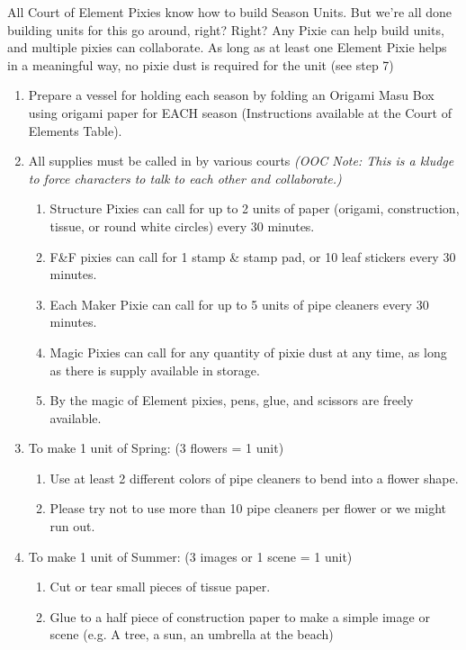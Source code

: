 \documentclass[green]{PP}
\begin{document}
\name{\gSesons{}}

All Court of Element Pixies know how to build Season Units. But we’re all done building units for this go around, right? Right? Any Pixie can help build units, and multiple pixies can collaborate. As long as at least one Element Pixie helps in a meaningful way, no pixie dust is required for the unit (see step 7)

\begin{enumerate}
	\item Prepare a vessel for holding each season by folding an Origami Masu Box using origami paper for EACH season (Instructions available at the Court of Elements Table).
	\item All supplies must be called in by various courts \textit{(OOC Note: This is a kludge to force characters to talk to each other and collaborate.)}
	\begin{enumerate}
		\item Structure Pixies can call for up to 2 units of paper (origami, construction, tissue, or round white circles) every 30 minutes.
		\item F\&F pixies can call for 1 stamp \& stamp pad, or 10 leaf stickers every 30 minutes.
		\item Each Maker Pixie can call for up to 5 units of pipe cleaners every 30 minutes.
		\item Magic Pixies can call for any quantity of pixie dust at any time, as long as there is supply available in storage.
		\item By the magic of Element pixies, pens, glue, and scissors are freely available.
	\end{enumerate}
	\item To make 1 unit of Spring: (3 flowers = 1 unit)
	\begin{enumerate}
		\item Use at least 2 different colors of pipe cleaners to bend into a flower shape.
		\item Please try not to use more than 10 pipe cleaners per flower or we might run out.
	\end{enumerate}
	\item To make 1 unit of Summer: (3 images or 1 scene = 1 unit)
	\begin{enumerate}
		\item Cut or tear small pieces of tissue paper.
		\item Glue to a half piece of construction paper to make a simple image or scene (e.g. A tree, a sun, an umbrella at the beach)

\end{enumerate}
\end{enumerate}
\end{document}
